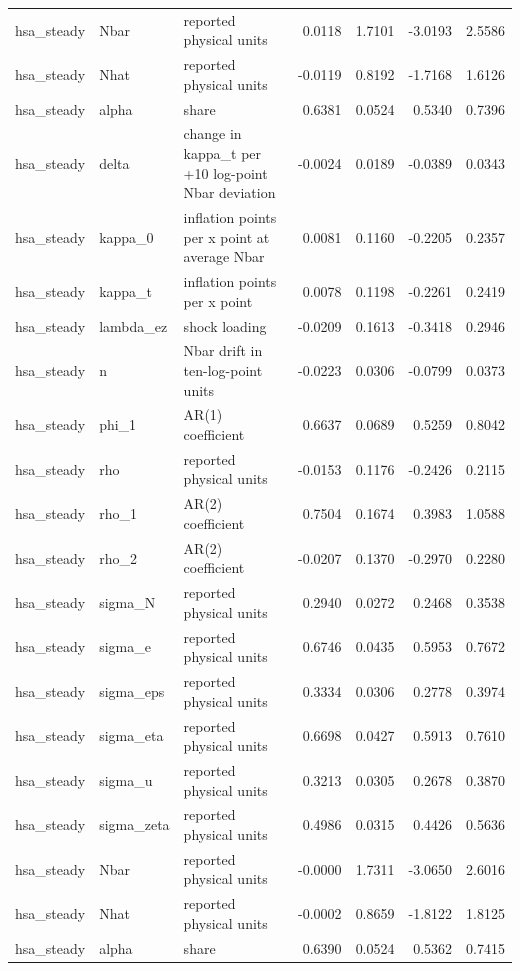 \begin{tabular}{lllrrrr}
hsa\_steady & Nbar & reported physical units & 0.0118 & 1.7101 & -3.0193 & 2.5586 \\
hsa\_steady & Nhat & reported physical units & -0.0119 & 0.8192 & -1.7168 & 1.6126 \\
hsa\_steady & alpha & share & 0.6381 & 0.0524 & 0.5340 & 0.7396 \\
hsa\_steady & delta & change in kappa\_t per +10 log-point Nbar deviation & -0.0024 & 0.0189 & -0.0389 & 0.0343 \\
hsa\_steady & kappa\_0 & inflation points per x point at average Nbar & 0.0081 & 0.1160 & -0.2205 & 0.2357 \\
hsa\_steady & kappa\_t & inflation points per x point & 0.0078 & 0.1198 & -0.2261 & 0.2419 \\
hsa\_steady & lambda\_ez & shock loading & -0.0209 & 0.1613 & -0.3418 & 0.2946 \\
hsa\_steady & n & Nbar drift in ten-log-point units & -0.0223 & 0.0306 & -0.0799 & 0.0373 \\
hsa\_steady & phi\_1 & AR(1) coefficient & 0.6637 & 0.0689 & 0.5259 & 0.8042 \\
hsa\_steady & rho & reported physical units & -0.0153 & 0.1176 & -0.2426 & 0.2115 \\
hsa\_steady & rho\_1 & AR(2) coefficient & 0.7504 & 0.1674 & 0.3983 & 1.0588 \\
hsa\_steady & rho\_2 & AR(2) coefficient & -0.0207 & 0.1370 & -0.2970 & 0.2280 \\
hsa\_steady & sigma\_N & reported physical units & 0.2940 & 0.0272 & 0.2468 & 0.3538 \\
hsa\_steady & sigma\_e & reported physical units & 0.6746 & 0.0435 & 0.5953 & 0.7672 \\
hsa\_steady & sigma\_eps & reported physical units & 0.3334 & 0.0306 & 0.2778 & 0.3974 \\
hsa\_steady & sigma\_eta & reported physical units & 0.6698 & 0.0427 & 0.5913 & 0.7610 \\
hsa\_steady & sigma\_u & reported physical units & 0.3213 & 0.0305 & 0.2678 & 0.3870 \\
hsa\_steady & sigma\_zeta & reported physical units & 0.4986 & 0.0315 & 0.4426 & 0.5636 \\
hsa\_steady & Nbar & reported physical units & -0.0000 & 1.7311 & -3.0650 & 2.6016 \\
hsa\_steady & Nhat & reported physical units & -0.0002 & 0.8659 & -1.8122 & 1.8125 \\
hsa\_steady & alpha & share & 0.6390 & 0.0524 & 0.5362 & 0.7415 \\

\end{tabular}
